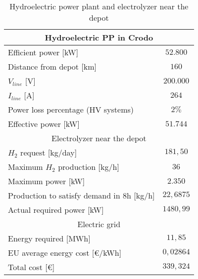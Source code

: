 \begin{table}[ht]
\centering
\begin{tabular}{|lc|}
\hline
\multicolumn{2}{|c|}{\cellcolor{bluepoli!40}Hydroelectric PP in Crodo}               \\ \hline
\multicolumn{1}{|l|}{Efficient power {[}kW{]}}                      & $52.800$       \\ \hline
\multicolumn{1}{|l|}{Distance from depot {[}km{]}}                  & $160$          \\ \hline
\multicolumn{1}{|l|}{$V_{line}$ {[}V{]}}                            & $200.000$      \\ \hline
\multicolumn{1}{|l|}{$I_{line}$ {[}A{]}}                            & $264$          \\ \hline
\multicolumn{1}{|l|}{Power loss percentage (HV systems)}            & $2\%$          \\ \hline
\multicolumn{1}{|l|}{Effective power {[}kW{]}}                      & $51.744$       \\ \hline
\multicolumn{2}{|c|}{\cellcolor{bluepoli!40}Electrolyzer near the depot}             \\ \hline
\multicolumn{1}{|l|}{$H_2$ request {[}kg/day{]}}                    & $181,50$       \\ \hline
\multicolumn{1}{|l|}{Maximum $H_2$ production {[}kg/h{]}}           & $36$           \\ \hline
\multicolumn{1}{|l|}{Maximum power {[}kW{]}}                        & $2.350$        \\ \hline
\multicolumn{1}{|l|}{Production to satisfy demand in 8h {[}kg/h{]}} & $22,6875$      \\ \hline
\multicolumn{1}{|l|}{Actual required power {[}kW{]}}                & $1480,99$      \\ \hline
\multicolumn{2}{|c|}{\cellcolor{bluepoli!40}Electric grid}                           \\ \hline
\multicolumn{1}{|l|}{Energy required {[}MWh{]}}                     & $11,85$        \\ \hline
\multicolumn{1}{|l|}{EU average energy cost {[}€/kWh{]}}            & $0,02864$      \\ \hline
\multicolumn{1}{|l|}{Total cost {[}€{]}}                            & $339,324$      \\ \hline
\end{tabular}
\caption{Hydroelectric power plant and electrolyzer near the depot}
\label{tab:secondsolution}
\end{table}